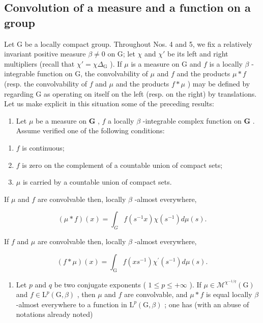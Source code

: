 \subsection{Convolution of a measure and a function on a group}

Let G be a locally compact group. Throughout Nos. 4 and 5, we fix a relatively invariant positive measure \(\beta \neq 0\) on G; let \(\chi\) and \(\chi'\) be its left and right multipliers (recall that \(\chi' = \chi \Delta_{\mathrm{G}}\) ). If \(\mu\) is a measure on G and \(f\) is a locally \(\beta\) -integrable function on G, the convolvability of \(\mu\) and \(f\) and the products \(\mu * f\) (resp. the convolvability of \(f\) and \(\mu\) and the products \(f * \mu\) ) may be defined by regarding G as operating on itself on the left (resp. on the right) by translations. Let us make explicit in this situation some of the preceding results:

\begin{enumerate}
\def\labelenumi{\arabic{enumi})}
\tightlist
\item
  Let \(\mu\) be a measure on \(\mathbf{G}\) , \(f\) a locally \(\beta\) -integrable complex function on \(\mathbf{G}\) . Assume verified one of the following conditions:
\end{enumerate}

\begin{enumerate}
\def\labelenumi{(\roman{enumi})}
\item
  \(f\) is continuous;
\item
  \(f\) is zero on the complement of a countable union of compact sets;
\item
  \(\mu\) is carried by a countable union of compact sets.
\end{enumerate}

If \(\mu\) and \(f\) are convolvable then, locally \(\beta\) -almost everywhere,

\[
(\mu * f) (x) = \int_ {G} f (s ^ {- 1} x) \chi (s ^ {- 1}) d \mu (s).\tag{10}
\]

If \(f\) and \(\mu\) are convolvable then, locally \(\beta\) -almost everywhere,

\[
(f * \mu) (x) = \int_ {\mathrm{G}} f (x s ^ {- 1}) \chi^ {\prime} (s ^ {- 1}) d \mu (s).\tag{11}
\]

\begin{enumerate}
\def\labelenumi{\arabic{enumi})}
\setcounter{enumi}{1}
\tightlist
\item
  Let \(p\) and \(q\) be two conjugate exponents ( \(1 \leqslant p \leqslant +\infty\) ). If \(\mu \in \mathcal{M}^{\chi^{-1/q}}(\mathrm{G})\) and \(f \in \mathrm{L}^p(\mathrm{G},\beta)\) , then \(\mu\) and \(f\) are convolvable, and \(\mu * f\) is equal locally \(\beta\) -almost everywhere to a function in \(\mathrm{L}^p(\mathrm{G},\beta)\) ; one has (with an abuse of notations already noted)
\end{enumerate}


